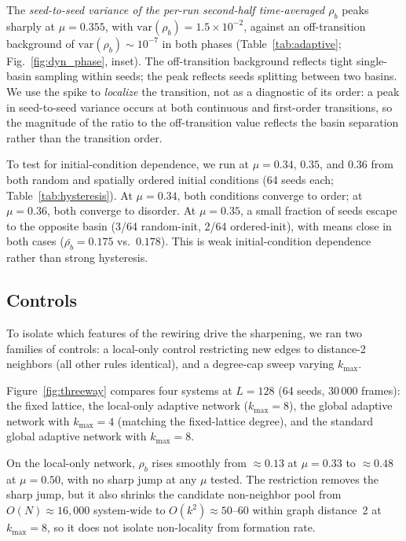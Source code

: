 \documentclass[preprint,12pt]{elsarticle}
\newcommand{\rb}{\rho_b}              %
\newcommand{\Lsys}{L}                 %
\newcommand{\kmax}{k_{\max}}           %
\begin{document}
The \emph{seed-to-seed variance of the per-run second-half
time-averaged $\rb$} peaks sharply at $\mu = 0.355$, with
$\mathrm{var}(\rb) = 1.5 \times 10^{-2}$, against an
off-transition background of $\mathrm{var}(\rb) \sim 10^{-7}$
in both phases (Table~\ref{tab:adaptive};
Fig.~\ref{fig:dyn_phase}, inset).
The off-transition background reflects tight single-basin
sampling within seeds; the peak reflects seeds splitting between
two basins.
We use the spike to \emph{localize} the transition, not as a
diagnostic of its order: a peak in seed-to-seed variance occurs
at both continuous and first-order transitions, so the magnitude
of the ratio to the off-transition value reflects the basin
separation rather than the transition order.

To test for initial-condition dependence, we run at
$\mu = 0.34$, $0.35$, and $0.36$ from both random and
spatially ordered initial conditions
(64 seeds each; Table~\ref{tab:hysteresis}).
At $\mu = 0.34$, both conditions converge to order;
at $\mu = 0.36$, both converge to disorder.
At $\mu = 0.35$, a small fraction of seeds escape to the
opposite basin (3/64 random-init, 2/64 ordered-init),
with means close in both cases
($\bar{\rb} = 0.175$ vs.\ $0.178$).
This is weak initial-condition dependence rather than
strong hysteresis.

\subsection{Controls}
\label{sec:local_control}

To isolate which features of the rewiring drive the
sharpening, we ran two families of controls: a local-only
control restricting new edges to distance-2 neighbors
(all other rules identical), and a degree-cap sweep
varying $\kmax$.

Figure~\ref{fig:threeway} compares four systems at
$\Lsys = 128$ (64 seeds, 30\,000 frames): the fixed lattice,
the local-only adaptive network ($\kmax = 8$), the global
adaptive network with $\kmax = 4$ (matching the fixed-lattice
degree), and the standard global adaptive network with
$\kmax = 8$.

On the local-only network, $\rb$ rises smoothly from
$\approx 0.13$ at $\mu = 0.33$ to $\approx 0.48$ at
$\mu = 0.50$, with no sharp jump at any $\mu$ tested.
The restriction removes the sharp jump, but it also shrinks
the candidate non-neighbor pool from $O(N) \approx 16{,}000$
system-wide to $O(k^2) \approx 50$--$60$ within graph
distance~2 at $\kmax = 8$, so it does not isolate non-locality
from formation rate.
\end{document}
